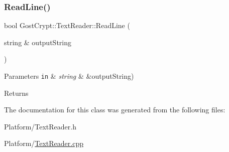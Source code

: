 \subsubsection{\texorpdfstring{Read\+Line()}{ReadLine()}}
{\footnotesize\ttfamily bool Gost\+Crypt\+::\+Text\+Reader\+::\+Read\+Line (\begin{DoxyParamCaption}\item[{string \&}]{output\+String }\end{DoxyParamCaption})\hspace{0.3cm}{\ttfamily [virtual]}}


\begin{DoxyParams}[1]{Parameters}
\mbox{\tt in}  & {\em string} & \&output\+String) \\
\hline
\end{DoxyParams}
\begin{DoxyReturn}{Returns}

\end{DoxyReturn}


The documentation for this class was generated from the following files\+:\begin{DoxyCompactItemize}
\item 
Platform/Text\+Reader.\+h\item 
Platform/\hyperlink{_text_reader_8cpp}{Text\+Reader.\+cpp}\end{DoxyCompactItemize}

